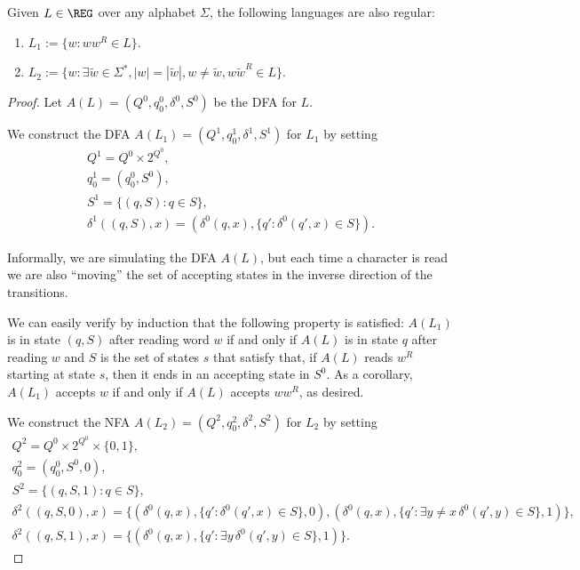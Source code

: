 \begin{lemma}
\label{lem:regularlang}
Given $L \in \REG$ over any alphabet $\Sigma$, the following languages are also regular:
\begin{enumerate}
    \item $L_1 := \{w : ww^R \in L\}$.
    \item $L_2 := \{w : \exists \tilde{w} \in \Sigma^*, |w| = |\tilde{w}|, w \neq \tilde{w}, w\tilde{w}^R \in L\}$.
\end{enumerate}
\end{lemma}
\begin{proof}
Let $A(L) = (Q^0, q^0_0, \delta^0, S^0)$ be the DFA for $L$.

We construct the DFA $A(L_1) = (Q^1, q^1_0, \delta^1, S^1)$ for $L_1$ by setting
\begin{gather*}
Q^1 = Q^0 \times 2^{Q^0}, \\ q_0^1 = (q_0^0, S^0), \\ S^1 = \{(q, S) : q \in S\}, \\
\delta^1((q, S), x) = (\delta^0(q, x), \{q' : \delta^0(q', x) \in S\}).
\end{gather*}

Informally, we are simulating the DFA $A(L)$, but each time a character is read we are also ``moving'' the set of accepting states
in the inverse direction of the transitions. 

We can easily verify by induction that the following property is satisfied: $A(L_1)$ is in state $(q, S)$ after reading word $w$ if and only if
$A(L)$ is in state $q$ after reading $w$ and $S$ is the set of states $s$ that satisfy that, if $A(L)$ reads $w^R$ starting at state $s$, then it
ends in an accepting state in $S^0$. As a corollary, $A(L_1)$ accepts $w$ if and only if $A(L)$ accepts $ww^R$, as desired. 

We construct the NFA $A(L_2) = (Q^2, q^2_0, \delta^2, S^2)$ for $L_2$ by setting
\begin{gather*}
Q^2 = Q^0 \times 2^{Q^0} \times \{0, 1\}, \\ q_0^2 = (q_0^0, S^0, 0), \\ S^2 = \{(q, S, 1) : q \in S\}, \\
\delta^2((q, S, 0), x) = \{(\delta^0(q, x), \{q' : \delta^0(q', x) \in S\}, 0), (\delta^0(q, x), \{q' : \exists y \neq x \, \delta^0(q', y) \in S\}, 1)\}, \\
\delta^2((q, S, 1), x) = \{(\delta^0(q, x), \{q' : \exists y \, \delta^0(q', y) \in S\}, 1)\}.
\end{gather*}


\end{proof}

